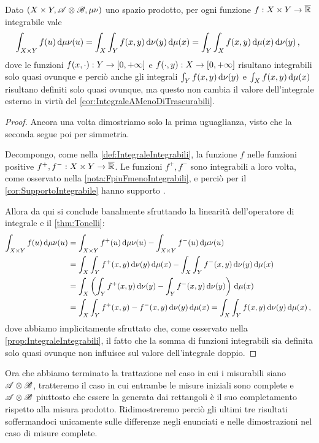 \begin{theorem}[Fubini]\label{thm:Fubini}
	Dato $(X\times Y,\mathscr A\otimes\mathscr B,\mu\nu)$ uno spazio prodotto, per ogni funzione $f:X\times Y\to\overline{\mathbb R}$ integrabile vale
	\begin{equation*}
		\int_{X\times Y}f(u)\,\mathrm d\mu\nu(u)=\int_X\int_Y f(x,y)\,\mathrm d\nu(y)\,\mathrm d\mu(x)=\int_Y\int_X f(x,y)\,\mathrm d\mu(x)\,\mathrm d\nu(y)\, \text{, }
	\end{equation*}
	dove le funzioni $f(x,\cdot):Y\to[0,+\infty]$ e $f(\cdot,y):X\to[0,+\infty]$ risultano integrabili solo quasi ovunque e perciò anche gli integrali $\int_Y f(x,y)\,\mathrm d\nu(y)$ e $\int_X f(x,y)\,\mathrm d\mu(x)$ risultano definiti solo quasi ovunque, ma questo non cambia il valore dell'integrale esterno in virtù del \cref{cor:IntegraleAMenoDiTrascurabili}.
\end{theorem}
\begin{proof}
	Ancora una volta dimostriamo solo la prima uguaglianza, visto che la seconda segue poi per simmetria.
	
	Decompongo, come nella \cref{def:IntegraleIntegrabili}, la funzione $f$ nelle funzioni positive $f^+,f^-:X\times Y\to\overline{\mathbb R}$.
	Le funzioni $f^+,f^-$ sono integrabili a loro volta, come osservato nella \cref{nota:FpiuFmenoIntegrabili}, e perciò per il \cref{cor:SupportoIntegrabile} hanno supporto \sigfin[o].
	
	Allora da qui si conclude banalmente sfruttando la linearità dell'operatore di integrale e il \cref{thm:Tonelli}:
	\begin{align*}
		\int_{X\times Y}f(u)\,\mathrm d\mu\nu(u)
		& =\int_{X\times Y}f^+(u)\,\mathrm d\mu\nu(u)-\int_{X\times Y}f^-(u)\,\mathrm d\mu\nu(u)\\
		&=\int_X\int_Y f^+(x,y)\,\mathrm d\nu(y)\,\mathrm d\mu(x)-\int_X\int_Y f^-(x,y)\,\mathrm d\nu(y)\,\mathrm d\mu(x)\\
		&=\int_X\left(\int_Y f^+(x,y)\,\mathrm d\nu(y)-\int_Y f^-(x,y)\,\mathrm d\nu(y)\right)\,\mathrm d\mu(x)\\
		&=\int_X\int_Y f^+(x,y)-f^-(x,y)\,\mathrm d\nu(y)\,\mathrm d\mu(x)
		=\int_X\int_Y f(x,y)\,\mathrm d\nu(y)\,\mathrm d\mu(x)\, \text{, }
	\end{align*}
	dove abbiamo implicitamente sfruttato che, come osservato nella \cref{prop:IntegraleIntegrabili}, il fatto che la somma di funzioni integrabili sia definita solo quasi ovunque non influisce sul valore dell'integrale doppio.
\end{proof}

Ora che abbiamo terminato la trattazione nel caso in cui i misurabili siano $\mathscr A\otimes\mathscr B$, tratteremo il caso in cui entrambe le misure iniziali sono complete e $\mathscr A\otimes\mathscr B$ piuttosto che essere la \sigalg{} generata dai rettangoli è il suo completamento rispetto alla misura prodotto.
Ridimostreremo perciò gli ultimi tre risultati soffermandoci unicamente sulle differenze negli enunciati e nelle dimostrazioni nel caso di misure complete.

